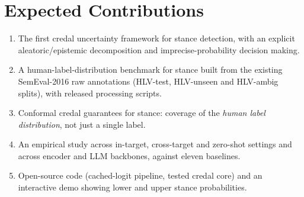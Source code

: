 \documentclass[11pt,a4paper]{article}
\begin{document}
\section{Expected Contributions}

\begin{enumerate}[leftmargin=*]
  \item The first credal uncertainty framework for stance detection, with an explicit
  aleatoric/epistemic decomposition and imprecise-probability decision making.
  \item A human-label-distribution benchmark for stance built from the existing SemEval-2016
  raw annotations (HLV-test, HLV-unseen and HLV-ambig splits), with released processing
  scripts.
  \item Conformal credal guarantees for stance: coverage of the \emph{human label
  distribution}, not just a single label.
  \item An empirical study across in-target, cross-target and zero-shot settings and across
  encoder and LLM backbones, against eleven baselines.
  \item Open-source code (cached-logit pipeline, tested credal core) and an interactive demo
  showing lower and upper stance probabilities.
\end{enumerate}
\end{document}
